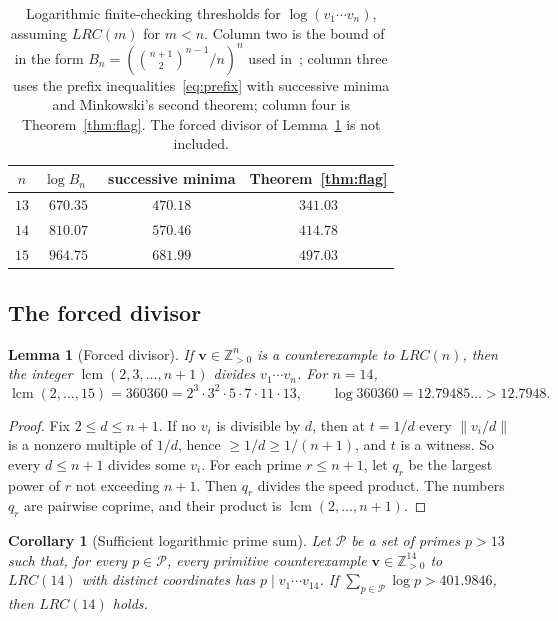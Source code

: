 \documentclass[11pt]{article}
\newtheorem{lemma}[theorem]{Lemma}
\newtheorem{corollary}[theorem]{Corollary}
\theoremstyle{definition}
\theoremstyle{remark}
\newcommand{\Z}{\mathbb{Z}}
\newcommand{\vct}[1]{\mathbf{#1}}
\newcommand{\nearest}[1]{\left\lVert #1\right\rVert}
\DeclareMathOperator{\lcm}{lcm}
\newcommand{\DivisorLogLB}{12.7948}       %
\newcommand{\TargetUB}{401.9846}          %
\begin{document}
\begin{table}[ht]\centering
\caption{Logarithmic finite-checking thresholds for $\log(v_1\cdots v_n)$,
assuming $LRC(m)$ for $m<n$.  Column two is the bound of~\cite{MSS25} in
the form $B_n=(\binom{n+1}{2}^{n-1}/n)^n$ used in~\cite{ST26,Allikvere26};
column three uses the prefix inequalities~\eqref{eq:prefix} with
successive minima and Minkowski's second theorem; column four is
Theorem~\ref{thm:flag}.  The forced divisor of Lemma~\ref{lem:divisor} is
not included.}
\label{tab:thresholds}
\begin{tabular}{@{}cccc@{}}\toprule
$n$ & $\log B_n$~\cite{MSS25} & successive minima & Theorem~\ref{thm:flag}\\
\midrule
$13$ & $670.35$ & $470.18$ & $341.03$\\
$14$ & $810.07$ & $570.46$ & $414.78$\\
$15$ & $964.75$ & $681.99$ & $497.03$\\
\bottomrule
\end{tabular}
\end{table}

\subsection{The forced divisor}

\begin{lemma}[Forced divisor]\label{lem:divisor}
If $\vct{v}\in\Z_{>0}^{n}$ is a counterexample to $LRC(n)$, then the
integer $\lcm(2,3,\ldots,n+1)$ divides $v_1\cdots v_n$.  For $n=14$,
\[
  \lcm(2,\ldots,15)=360360=2^3\cdot3^2\cdot5\cdot7\cdot11\cdot13,\qquad
  \log360360=12.79485\ldots>\DivisorLogLB .
\]
\end{lemma}

\begin{proof}
Fix $2\leq d\leq n+1$.  If no $v_i$ is divisible by $d$, then at
$t=1/d$ every $\nearest{v_i/d}$ is a nonzero multiple of $1/d$, hence
$\geq1/d\geq1/(n+1)$, and $t$ is a witness.  So every $d\leq n+1$
divides some $v_i$.  For each prime $r\leq n+1$, let $q_r$ be the largest
power of $r$ not exceeding $n+1$.  Then $q_r$ divides the speed product.
The numbers $q_r$ are pairwise coprime, and their product is
$\lcm(2,\ldots,n+1)$.
\end{proof}

\begin{corollary}[Sufficient logarithmic prime sum]\label{cor:mass}
Let $\mathcal P$ be a set of primes $p>13$ such that, for every $p\in
\mathcal P$, every primitive counterexample
$\vct{v}\in\Z_{>0}^{14}$ to $LRC(14)$ with distinct coordinates has
$p\mid v_1\cdots v_{14}$.  If
$\sum_{p\in\mathcal P}\log p>\TargetUB$, then $LRC(14)$ holds.
\end{corollary}
\end{document}
